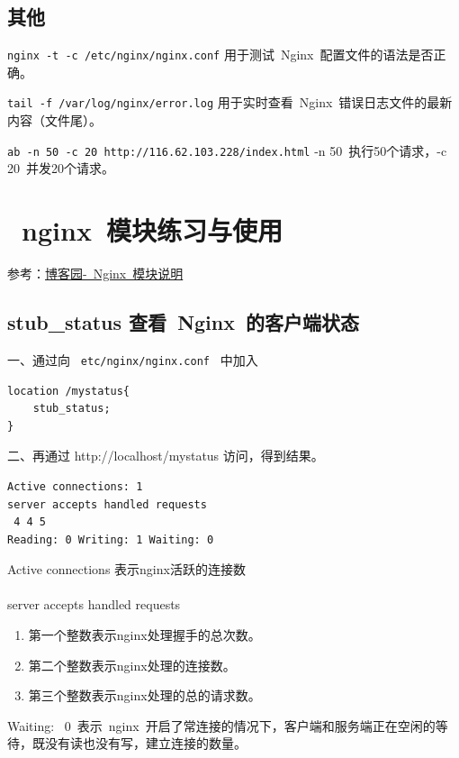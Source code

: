 \documentclass[12pt, a4paper]{article} %
\begin{document}
\begin{CJK*}{UTF8}{gbsn}
\subsection{其他}

\verb|nginx -t -c /etc/nginx/nginx.conf| 用于测试~Nginx~配置文件的语法是否正确。

\verb|tail -f /var/log/nginx/error.log| 用于实时查看~Nginx~错误日志文件的最新内容（文件尾）。

\verb|ab -n 50 -c 20 http://116.62.103.228/index.html|  -n 50~执行50个请求，-c 20~并发20个请求。


\clearpage
\section{~nginx~模块练习与使用}

参考：\href{https://www.cnblogs.com/guarderming/p/10219661.html}{博客园-~Nginx~模块说明}

\subsection{stub\_status 查看~Nginx~的客户端状态}

一、通过向 \verb| etc/nginx/nginx.conf | 中加入

\begin{lstlisting}
location /mystatus{
    stub_status;
}
\end{lstlisting}

二、再通过 http://localhost/mystatus 访问，得到结果。

\begin{lstlisting}
Active connections: 1
server accepts handled requests
 4 4 5
Reading: 0 Writing: 1 Waiting: 0
\end{lstlisting}

Active connections 表示nginx活跃的连接数 \\\\
server accepts handled requests
\begin{enumerate}
    \item 第一个整数表示nginx处理握手的总次数。
    \item 第二个整数表示nginx处理的连接数。
    \item 第三个整数表示nginx处理的总的请求数。
\end{enumerate}
Waiting: ~0~表示~nginx~开启了常连接的情况下，客户端和服务端正在空闲的等待，既没有读也没有写，建立连接的数量。


\end{CJK*}
\end{document}
